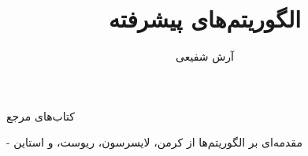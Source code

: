 \documentclass[aspectratio=169]{beamer}
\title{الگوریتم‌های پیشرفته}
\author{آرش شفیعی}
\institute{\texttt{[image: logos/ui.png]}}
\date{}
\begin{document}
\begin{frame}[plain]
	\maketitle
\end{frame}

\setcounter{framenumber}{0}
\raggedleft

\begin{itemframe}{کتاب‌های مرجع}{}
\itmsep{5mm}
\item[-]
مقدمه‌ای بر الگوریتم‌ها از کرمن، لایسرسون، ریوست، و استاین

\end{itemframe}


\end{document}
